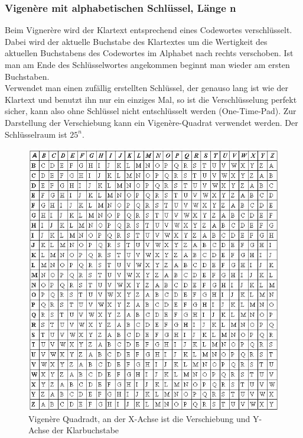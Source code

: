 \documentclass[a4paper,12pt]{article}
\begin{document}
\subsubsection{Vigenère mit alphabetischen Schlüssel, Länge n}
Beim Vignerère wird der Klartext entsprechend eines Codewortes verschlüsselt. Dabei wird der aktuelle Buchstabe des Klartextes um die Wertigkeit des aktuellen Buchstabens des Codewortes im Alphabet nach rechts verschoben. Ist man am Ende des Schlüsselwortes angekommen beginnt man wieder am ersten Buchstaben.\\
Verwendet man einen zufällig erstellten Schlüssel, der genauso lang ist wie der Klartext und benutzt ihn nur ein einziges Mal, so ist die Verschlüsselung perfekt sicher, kann also ohne Schlüssel nicht entschlüsselt werden (One-Time-Pad).
Zur Darstellung der Verschiebung kann ein Vigenère-Quadrat verwendet werden. Der Schlüsselraum ist $25^n$.\\
\begin{figure}[h!]
\centering
\includegraphics[scale=0.7]{Grafiken/VigenereSquare.jpg}
\caption{Vigenère Quadradt, an der X-Achse ist die Verschiebung und Y-Achse der Klarbuchstabe}
\end{figure}
\end{document}
